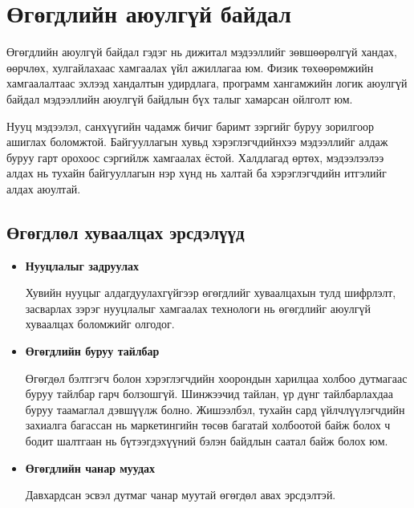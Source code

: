 \section{Өгөгдлийн аюулгүй байдал}

Өгөгдлийн аюулгүй байдал гэдэг нь дижитал мэдээллийг зөвшөөрөлгүй хандах, өөрчлөх, хулгайлахаас хамгаалах үйл ажиллагаа юм. Физик төхөөрөмжийн хамгаалалтаас эхлээд хандалтын удирдлага, программ хангамжийн логик аюулгүй байдал мэдээллийн аюулгүй байдлын бүх талыг хамарсан ойлголт юм. \cite{IBMSecureData}

Нууц мэдээлэл, санхүүгийн чадамж бичиг баримт зэргийг буруу зорилгоор ашиглах боломжтой.
Байгууллагын хувьд хэрэглэгчдийнхээ мэдээллийг алдаж буруу гарт орохоос сэргийлж хамгаалах ёстой. Халдлагад өртөх, мэдээлээлээ алдах нь тухайн байгууллагын нэр хүнд нь халтай ба хэрэглэгчдийн итгэлийг алдах аюултай.

\subsection{Өгөгдлөл хуваалцах эрсдэлүүд}

\begin{itemize}
    \item \textbf{Нууцлалыг задруулах}

    Хувийн нууцыг алдагдуулахгүйгээр өгөгдлийг хуваалцахын тулд шифрлэлт, засварлах зэрэг нууцлалыг хамгаалах технологи нь өгөгдлийг аюулгүй хуваалцах боломжийг олгодог.
    \item \textbf{Өгөгдлийн буруу тайлбар}
    
    Өгөгдөл бэлтгэгч болон хэрэглэгчдийн хоорондын харилцаа холбоо дутмагаас буруу тайлбар гарч болзошгүй. Шинжээчид тайлан, үр дүнг тайлбарлахдаа буруу таамаглал дэвшүүлж болно. Жишээлбэл, тухайн сард үйлчлүүлэгчдийн захиалга багассан нь маркетингийн төсөв багатай холбоотой байж болох ч бодит шалтгаан нь бүтээгдэхүүний бэлэн байдлын саатал байж болох юм.
    \item \textbf{Өгөгдлийн чанар муудах}
    
    Давхардсан эсвэл дутмаг чанар муутай өгөгдөл авах эрсдэлтэй.
\end{itemize}

